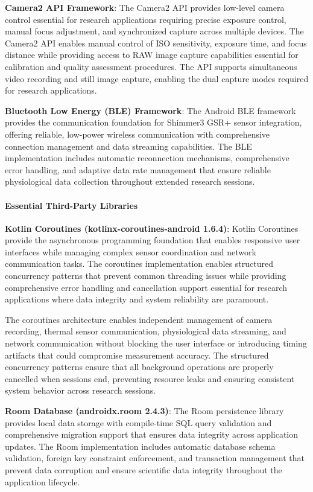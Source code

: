 \documentclass[12pt,a4paper]{article}
\begin{document}
\textbf{Camera2 API Framework}: The Camera2 API provides low-level camera control essential for research applications
requiring precise exposure control, manual focus adjustment, and synchronized capture across multiple devices. The
Camera2 API enables manual control of ISO sensitivity, exposure time, and focus distance while providing access to RAW
image capture capabilities essential for calibration and quality assessment procedures. The API supports simultaneous
video recording and still image capture, enabling the dual capture modes required for research applications.

\textbf{Bluetooth Low Energy (BLE) Framework}: The Android BLE framework provides the communication foundation for Shimmer3
GSR+ sensor integration, offering reliable, low-power wireless communication with comprehensive connection management
and data streaming capabilities. The BLE implementation includes automatic reconnection mechanisms, comprehensive error
handling, and adaptive data rate management that ensure reliable physiological data collection throughout extended
research sessions.

\paragraph{Essential Third-Party Libraries}

\textbf{Kotlin Coroutines (kotlinx-coroutines-android 1.6.4)}: Kotlin Coroutines provide the asynchronous programming
foundation that enables responsive user interfaces while managing complex sensor coordination and network communication
tasks. The coroutines implementation enables structured concurrency patterns that prevent common threading issues while
providing comprehensive error handling and cancellation support essential for research applications where data integrity
and system reliability are paramount.

The coroutines architecture enables independent management of camera recording, thermal sensor communication,
physiological data streaming, and network communication without blocking the user interface or introducing timing
artifacts that could compromise measurement accuracy. The structured concurrency patterns ensure that all background
operations are properly cancelled when sessions end, preventing resource leaks and ensuring consistent system behavior
across research sessions.

\textbf{Room Database (androidx.room 2.4.3)}: The Room persistence library provides local data storage with compile-time SQL
query validation and comprehensive migration support that ensures data integrity across application updates. The Room
implementation includes automatic database schema validation, foreign key constraint enforcement, and transaction
management that prevent data corruption and ensure scientific data integrity throughout the application lifecycle.
\end{document}
